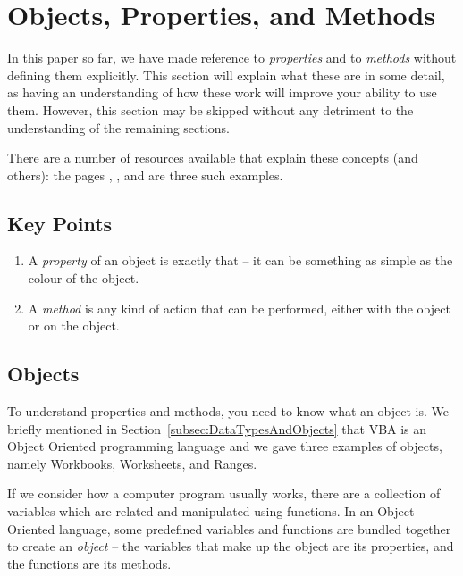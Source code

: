 \documentclass[11pt]{article}%
\begin{document}
\section{Objects, Properties, and Methods}

In this paper so far, we have made reference to \textit{properties} and to \textit{methods} without defining them explicitly. This section will explain what these are in some detail, as having an understanding of how these work will improve your ability to use them. However, this section may be skipped without any detriment to the understanding of the remaining sections.

There are a number of resources available that explain these concepts (and others): the pages \cite{VBAMethods}, \cite{ExplainOOPTo6YO}, and \cite{UnderstandingOPM} are three such examples.


\subsection{Key Points}

\begin{enumerate}
    \item A \textit{property} of an object is exactly that -- it can be something as simple as the colour of the object.
    \item A \textit{method} is any kind of action that can be performed, either with the object or on the object.
\end{enumerate}


\subsection{Objects}

To understand properties and methods, you need to know what an object is. We briefly mentioned in Section~\ref{subsec:DataTypesAndObjects} that VBA is an Object Oriented programming language and we gave three examples of objects, namely Workbooks, Worksheets, and Ranges.


If we consider how a computer program usually works, there are a collection of variables which are related and manipulated using functions. In an Object Oriented language, some predefined variables and functions are bundled together to create an \textit{object} -- the variables that make up the object are its properties, and the functions are its methods.
\end{document}

